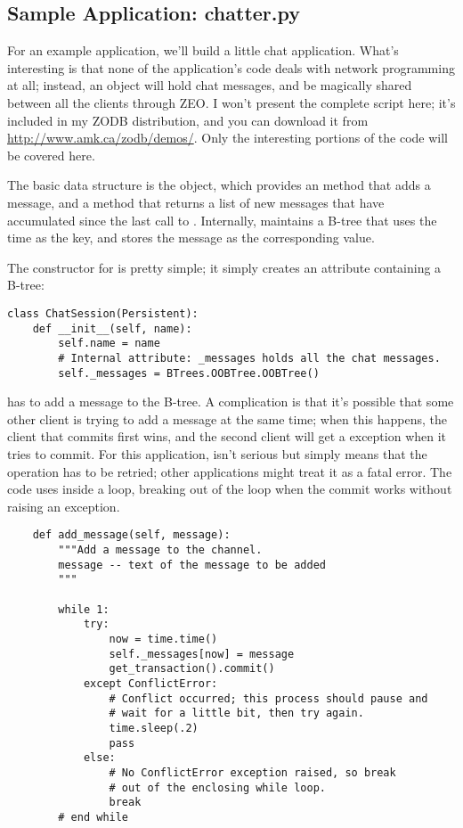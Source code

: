 \subsection{Sample Application: chatter.py}

For an example application, we'll build a little chat application.
What's interesting is that none of the application's code deals with
network programming at all; instead, an object will hold chat
messages, and be magically shared between all the clients through ZEO.
I won't present the complete script here; it's included in my ZODB
distribution, and you can download it from
\url{http://www.amk.ca/zodb/demos/}.  Only the interesting portions of
the code will be covered here.

The basic data structure is the  object,
which provides an  method that adds a
message, and a  method that returns a list
of new messages that have accumulated since the last call to
.  Internally, 
maintains a B-tree that uses the time as the key, and stores the
message as the corresponding value.

The constructor for  is pretty simple; it simply
creates an attribute containing a B-tree:

\begin{verbatim}
class ChatSession(Persistent):
    def __init__(self, name):
        self.name = name
        # Internal attribute: _messages holds all the chat messages.        
        self._messages = BTrees.OOBTree.OOBTree()        
\end{verbatim}

 has to add a message to the
 B-tree.  A complication is that it's possible
that some other client is trying to add a message at the same time;
when this happens, the client that commits first wins, and the second
client will get a  exception when it tries to
commit.  For this application,  isn't serious
but simply means that the operation has to be retried; other
applications might treat it as a fatal error.  The code uses
 inside a  loop,
breaking out of the loop when the commit works without raising an
exception.

\begin{verbatim}
    def add_message(self, message):
        """Add a message to the channel.
        message -- text of the message to be added
        """

        while 1:
            try:
                now = time.time()
                self._messages[now] = message
                get_transaction().commit()
            except ConflictError:
                # Conflict occurred; this process should pause and
                # wait for a little bit, then try again.
                time.sleep(.2)
                pass
            else:
                # No ConflictError exception raised, so break
                # out of the enclosing while loop.
                break
        # end while
\end{verbatim}

